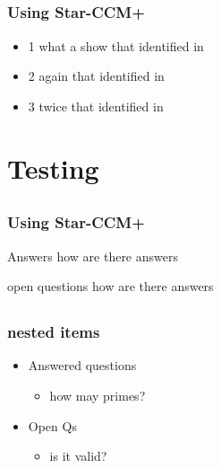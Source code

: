 \documentclass[ignorenonframetext,]{beamer}
\begin{document}
\subsection{}
\begin{frame}[fragile,t]
  \frametitle{Using Star-CCM+}
  \begin{itemize}
    \itemsep1pt\parskip0pt
    \item 1 what a show that identified in
    \item 2 again that identified in
    \item 3 twice that identified in
  \end{itemize}
\end{frame}

\section{Testing}\label{testing}
\subsection{}
\begin{frame}[fragile,t]
  \frametitle{Using Star-CCM+}
  \begin{block}{Answers}
    how are there answers
  \end{block}
  \pause
  \begin{block}{open questions}
    how are there answers
  \end{block}
\end{frame}

\subsection{}
\begin{frame}
  \frametitle{nested items}
  \begin{itemize}
    \item Answered questions
      \begin{itemize}
        \item how may primes?
      \end{itemize}
    \item Open Qs
      \begin{itemize}
        \item is it valid?
      \end{itemize}
  \end{itemize}
\end{frame}
\end{document}

